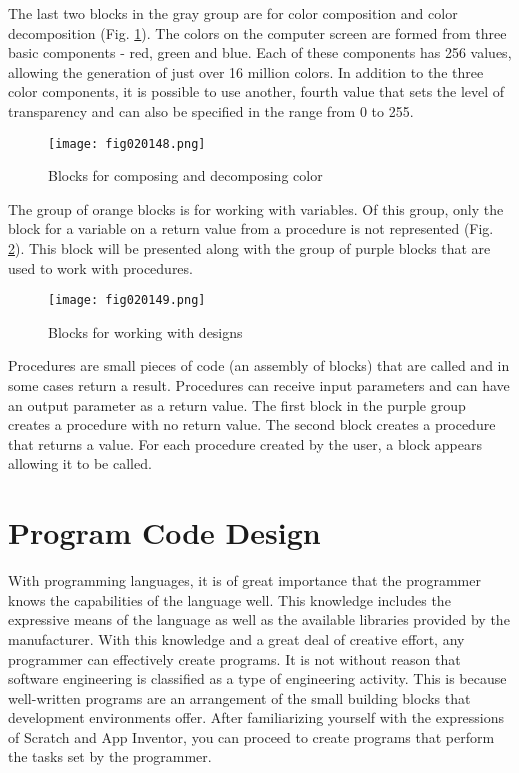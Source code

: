 The last two blocks in the gray group are for color composition and color decomposition (Fig. \ref{fig020148}). The colors on the computer screen are formed from three basic components - red, green and blue. Each of these components has 256 values, allowing the generation of just over 16 million colors. In addition to the three color components, it is possible to use another, fourth value that sets the level of transparency and can also be specified in the range from 0 to 255.

\begin{figure}[H]
   \centering
   \texttt{[image: fig020148.png]}
   \caption{Blocks for composing and decomposing color}
\label{fig020148}
\end{figure}

The group of orange blocks is for working with variables. Of this group, only the block for a variable on a return value from a procedure is not represented (Fig. \ref{fig020149}). This block will be presented along with the group of purple blocks that are used to work with procedures.

\begin{figure}[H]
   \centering
   \texttt{[image: fig020149.png]}
   \caption{Blocks for working with designs}
\label{fig020149}
\end{figure}

Procedures are small pieces of code (an assembly of blocks) that are called and in some cases return a result. Procedures can receive input parameters and can have an output parameter as a return value. The first block in the purple group creates a procedure with no return value. The second block creates a procedure that returns a value. For each procedure created by the user, a block appears allowing it to be called.

\section{Program Code Design}

With programming languages, it is of great importance that the programmer knows the capabilities of the language well. This knowledge includes the expressive means of the language as well as the available libraries provided by the manufacturer. With this knowledge and a great deal of creative effort, any programmer can effectively create programs. It is not without reason that software engineering is classified as a type of engineering activity. This is because well-written programs are an arrangement of the small building blocks that development environments offer. After familiarizing yourself with the expressions of Scratch and App Inventor, you can proceed to create programs that perform the tasks set by the programmer.
